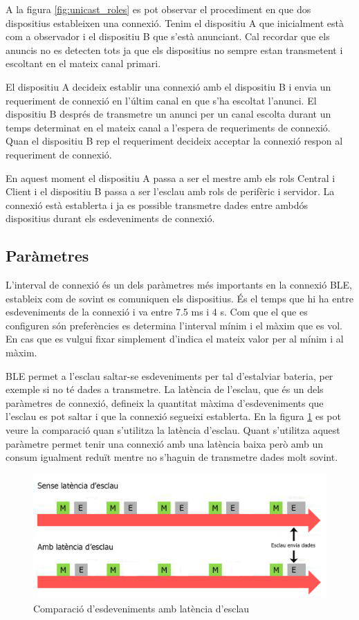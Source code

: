 A la figura \ref{fig:unicast_roles} es pot observar el procediment en que dos dispositius estableixen una connexió.
Tenim el dispositiu A que inicialment està com a observador i el dispositiu B que s'està anunciant.
Cal recordar que els anuncis no es detecten tots ja que els dispositius no sempre estan transmetent i escoltant en el mateix canal primari.

El dispositiu A decideix establir una connexió amb el dispositiu B i envia un requeriment de connexió en l'últim canal en que s'ha escoltat l'anunci.
El dispositiu B després de transmetre un anunci per un canal escolta durant un temps determinat en el mateix canal a l'espera de requeriments de connexió.
Quan el dispositiu B rep el requeriment decideix acceptar la connexió respon al requeriment de connexió.

En aquest moment el dispositiu A passa a ser el mestre amb els rols Central i Client i el dispositiu B passa a ser l'esclau amb rols de perifèric i servidor.
La connexió està establerta i ja es possible transmetre dades entre ambdós dispositius durant els esdeveniments de connexió. 


\subsection{Paràmetres}
L'interval de connexió és un dels paràmetres més importants en la connexió BLE, estableix com de sovint es comuniquen els dispositius.
És el temps que hi ha entre esdeveniments de la connexió i va entre 7.5 ms i 4 s.
Com que el que es configuren són preferències es determina l'interval mínim i el màxim que es vol.
En cas que es vulgui fixar simplement d'indica el mateix valor per al mínim i al màxim.

BLE permet a l'esclau saltar-se esdeveniments per tal d'estalviar bateria, per exemple si no té dades a transmetre.
La latència de l'esclau, que és un dels paràmetres de connexió, defineix la quantitat màxima d'esdeveniments que l'esclau es pot saltar i que la connexió segueixi establerta.
En la figura \ref{fig:slave_latency} es pot veure la comparació quan s'utilitza la latència d'esclau.
Quant s'utilitza aquest paràmetre permet tenir una connexió amb una latència baixa però amb un consum igualment reduït mentre no s'haguin de transmetre dades molt sovint.

\begin{figure}[!h]
	\begin{center}
		\includegraphics{./images/slave_latency_new.png}
		\caption{Comparació d'esdeveniments amb latència d'esclau \cite{slave_latency}}
		\label{fig:slave_latency}
	\end{center}
\end{figure}

